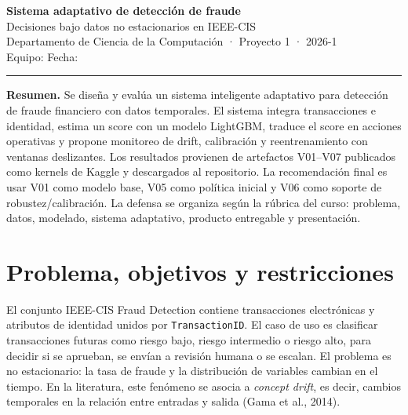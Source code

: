 \documentclass[11pt,letterpaper]{article}
\begin{document}
\begin{center}
{\Large\sffamily\bfseries\color{navy} Sistema adaptativo de detección de fraude}\\[2pt]
{\large\sffamily Decisiones bajo datos no estacionarios en IEEE-CIS}\\[6pt]
{\small Departamento de Ciencia de la Computación · Proyecto 1 · 2026-1}\\[3pt]
{\small Equipo: \underline{\hspace{8cm}} \quad Fecha: \underline{\hspace{2.1cm}}}
\end{center}
\vspace{-4pt}\hrule\vspace{4pt}

\textbf{Resumen.} Se diseña y evalúa un sistema inteligente adaptativo para detección de fraude financiero con datos temporales. El sistema integra transacciones e identidad, estima un score con un modelo LightGBM, traduce el score en acciones operativas y propone monitoreo de drift, calibración y reentrenamiento con ventanas deslizantes. Los resultados provienen de artefactos V01--V07 publicados como kernels de Kaggle y descargados al repositorio. La recomendación final es usar V01 como modelo base, V05 como política inicial y V06 como soporte de robustez/calibración. La defensa se organiza según la rúbrica del curso: problema, datos, modelado, sistema adaptativo, producto entregable y presentación.

\section{Problema, objetivos y restricciones}

El conjunto IEEE-CIS Fraud Detection contiene transacciones electrónicas y atributos de identidad unidos por \texttt{TransactionID}. El caso de uso es clasificar transacciones futuras como riesgo bajo, riesgo intermedio o riesgo alto, para decidir si se aprueban, se envían a revisión humana o se escalan. El problema es no estacionario: la tasa de fraude y la distribución de variables cambian en el tiempo. En la literatura, este fenómeno se asocia a \emph{concept drift}, es decir, cambios temporales en la relación entre entradas y salida (Gama et al., 2014).
\end{document}
